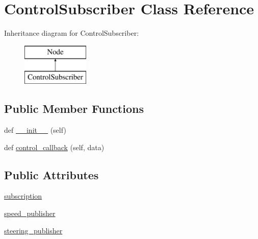 \hypertarget{classtoxic__hardware_1_1controller_1_1ControlSubscriber}{}\section{Control\+Subscriber Class Reference}
\label{classtoxic__hardware_1_1controller_1_1ControlSubscriber}
Inheritance diagram for Control\+Subscriber\+:\begin{figure}[H]
\begin{center}
\leavevmode
\includegraphics[height=2.000000cm]{d0/d16/classtoxic__hardware_1_1controller_1_1ControlSubscriber}
\end{center}
\end{figure}
\subsection*{Public Member Functions}
\begin{DoxyCompactItemize}
\item 
def \mbox{\hyperlink{classtoxic__hardware_1_1controller_1_1ControlSubscriber_ae64f0875afe3067b97ba370b354b9213}{\+\_\+\+\_\+init\+\_\+\+\_\+}} (self)
\item 
def \mbox{\hyperlink{classtoxic__hardware_1_1controller_1_1ControlSubscriber_a33e86027586e42bbaff819e19bef44d7}{control\+\_\+callback}} (self, data)
\end{DoxyCompactItemize}
\subsection*{Public Attributes}
\begin{DoxyCompactItemize}
\item 
\mbox{\hyperlink{classtoxic__hardware_1_1controller_1_1ControlSubscriber_a4b0698733c4dfaffe8e2b4cd952b6f82}{subscription}}
\item 
\mbox{\hyperlink{classtoxic__hardware_1_1controller_1_1ControlSubscriber_a2c40ddb28f990d22e258f62732f23fa4}{speed\+\_\+publisher}}
\item 
\mbox{\hyperlink{classtoxic__hardware_1_1controller_1_1ControlSubscriber_a194634798f6a458c7f9750bcd232fbbc}{steering\+\_\+publisher}}
\end{DoxyCompactItemize}


